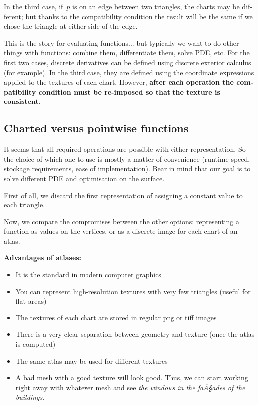 \documentclass{article}
\begin{document}
\begin{otherlanguage}{british}
In the third case, if~$p$ is on an edge between two triangles, the charts may
be different; but thanks to the compatibility condition the result will be
the same if we chose the triangle at either side of the edge.


This is the story for evaluating functions... but typically we want to do
other things with functions: combine them, differentiate them, solve PDE,
etc.  For the first two cases, discrete derivatives can be defined using
discrete exterior calculus (for example).  In the third case, they are
defined using the coordinate expressions applied to the textures of each
chart.  However, {\bf after each operation the compatibility condition must be
re-imposed so that the texture is consistent.}

\subsection{Charted versus pointwise functions}

It seems that all required operations are possible with either
representation.  So the choice of which one to use is mostly a matter of
convenience (runtime speed, stockage requirements, ease of implementation).
Bear in mind that our goal is to solve different PDE and optimisation on the
surface.

First of all, we discard the first representation of assigning a constant
value to each triangle.

Now, we compare the compromises between the other options: representing a
function as values on the vertices, or as a discrete image for each chart of
an atlas.

{\bf Advantages of atlases:}

\begin{itemize}
	\item It is the standard in modern computer graphics
	\item You can represent high-resolution textures with very few
		triangles (useful for flat areas)
	\item The textures of each chart are stored in regular png or tiff
		images
	\item There is a very clear separation between geometry and texture
		(once the atlas is computed)
	\item The same atlas may be used for different textures
	\item A bad mesh with a good texture will look good.  Thus, we can
		start working right away with whatever mesh and see \emph{the
		windows in the faÀ§ades of the buildings}.
\end{itemize}


\end{otherlanguage}
\end{document}
